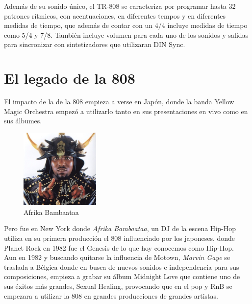 \documentclass{article}
\begin{document}
Además de su sonido único, el TR-808 se caracteriza por programar hasta 32 patrones rítmicos, con acentuaciones, en diferentes tempos y en diferentes medidas de tiempo, que además de contar con un 4/4 incluye medidas de tiempo como 5/4 y 7/8. También incluye volumen para cada uno de los sonidos y salidas para sincronizar con sintetizadores que utilizaran DIN Sync\cite{wiki808}.

\endgroup

\section{El legado de la 808}

El impacto de la de la 808 empieza a verse en Japón, donde la banda Yellow Magic Orchestra empezó a utilizarlo tanto en sus presentaciones en vivo como en sus álbumes.\\

\begingroup
\setlength{\intextsep}{0pt}%
\setlength{\columnsep}{0pt}%

\begin{figure}
    \centering
    \includegraphics[width=0.35\textwidth]{images/afrika.jpg}
    \vspace{-5pt}
    \caption{Afrika Bambaataa}
\end{figure}

Pero fue en New York donde \emph{Afrika Bambaataa}, un DJ de la escena Hip-Hop utiliza en su primera producción el 808 influenciado por los japoneses, donde Planet Rock en 1982 fue el Genesis de lo que hoy conocemos como Hip-Hop.\cite{808film}\\

Aun en 1982 y buscando quitarse la influencia de Motown, \emph{Marvin Gaye} se traslada a Bélgica donde en busca de nuevos sonidos e independencia para sus composiciones, empieza a grabar su álbum Midnight Love que contiene uno de sus éxitos más grandes, Sexual Healing, provocando que en el pop y RnB se empezara a utilizar la 808 en grandes producciones de grandes artistas.\cite{808film}\cite{slaves}\\
\end{document}
